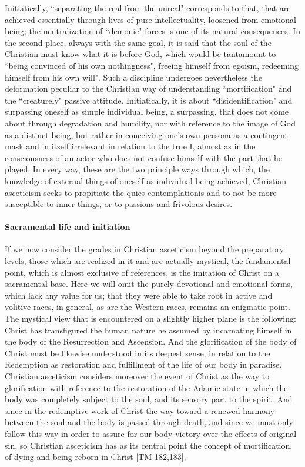 Initiatically, ``separating the real from the unreal" corresponds to that, that are achieved essentially through lives of pure intellectuality, loosened from emotional being; the neutralization of ``demonic" forces is one of its natural consequences. In the second place, always with the same goal, it is said that the soul of the Christian must know what it is before God, which would be tantamount to ``being convinced of his own nothingness", freeing himself from egoism, redeeming himself from his own will". Such a discipline undergoes nevertheless the deformation peculiar to the Christian way of understanding ``mortification" and the ``creaturely" passive attitude. Initiatically, it is about ``disidentification" and surpassing oneself as simple individual being, a surpassing, that does not come about through degradation and humility, nor with reference to the image of God as a distinct being, but rather in conceiving one's own persona as a contingent mask and in itself irrelevant in relation to the true I, almost as in the consciousness of an actor who does not confuse himself with the part that he played. In every way, these are the two principle ways through which, the knowledge of external things of oneself as individual being achieved, Christian asceticism seeks to propitiate the quies contemplationis and to not be more susceptible to inner things, or to passions and frivolous desires.

\paragraph{Sacramental life and initiation}

If we now consider the grades in Christian asceticism beyond the preparatory levels, those which are realized in it and are actually mystical, the fundamental point, which is almost exclusive of references, is the imitation of Christ on a sacramental base. Here we will omit the purely devotional and emotional forms, which lack any value for us; that they were able to take root in active and volitive races, in general, as are the Western races, remains an enigmatic point. The mystical view that is encountered on a slightly higher plane is the following: Christ has transfigured the human nature he assumed by incarnating himself in the body of the Resurrection and Ascension. And the glorification of the body of Christ must be likewise understood in its deepest sense, in relation to the Redemption as restoration and fulfillment of the life of our body in paradise. Christian asceticism considers moreover the event of Christ as the way to glorification with reference to the restoration of the Adamic state in which the body was completely subject to the soul, and its sensory part to the spirit. And since in the redemptive work of Christ the way toward a renewed harmony between the soul and the body is passed through death, and since we must only follow this way in order to assure for our body victory over the effects of original sin, so Christian asceticism has as its central point the concept of mortification, of dying and being reborn in Christ [TM 182,183].

